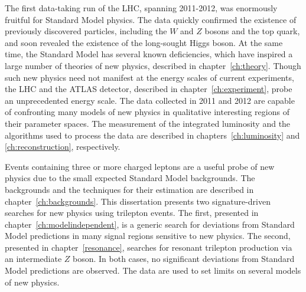 The first data-taking run of the LHC, spanning 2011-2012, was enormously fruitful for Standard Model physics. The data quickly confirmed the existence of previously discovered particles, including the $W$ and $Z$ bosons and the top quark, and soon revealed the existence of the long-sought Higgs boson. At the same time, the Standard Model has several known deficiencies, which have inspired a large number of theories of new physics, described in chapter~\ref{ch:theory}. Though such new physics need not manifest at the energy scales of current experiments, the LHC and the ATLAS detector, described in chapter~\ref{ch:experiment}, probe an unprecedented energy scale. The data collected in 2011 and 2012 are capable of confronting many models of new physics in qualitative interesting regions of their parameter spaces. The measurement of the integrated luminosity and the algorithms used to process the data are described in chapters~\ref{ch:luminosity} and \ref{ch:reconstruction}, respectively. 

Events containing three or more charged leptons are a useful probe of new physics due to the small expected Standard Model backgrounds. The backgrounds and the techniques for their estimation are described in chapter~\ref{ch:backgrounds}.  This dissertation presents two signature-driven searches for new physics using trilepton events. The first, presented in chapter~\ref{ch:modelindependent}, is a generic search for deviations from Standard Model predictions in many signal regions sensitive to new physics. The second, presented in chapter~\ref{resonance}, searches for resonant trilepton production via an intermediate $Z$ boson. In both cases, no significant deviations from Standard Model predictions are observed. The data are used to set limits on several models of new physics. 

